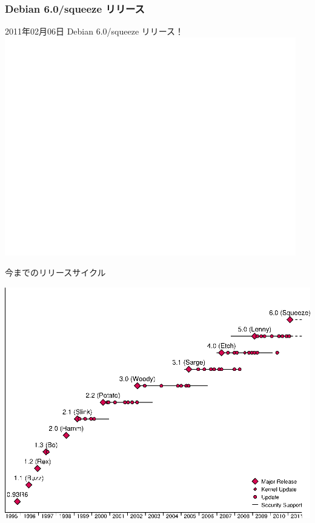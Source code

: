 \begin{frame}
 \frametitle{Debian 6.0/squeeze リリース}
\begin{center}
2011年02月06日 Debian 6.0/squeeze リリース！\\
\includegraphics[width=1.0\vsize]{image201103/squeeze.jpg}
\end{center}
\end{frame}


\begin{frame}{今までのリリースサイクル}
\begin{center}
\includegraphics[width=1.1\vsize]{image201103/releases.png}
\end{center}
\end{frame}

